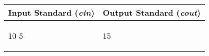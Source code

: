 \documentclass[12pt,a4paper]{article}
\begin{document}
\begin{tabular}{|@{}p{}@{}|@{}p{}@{}|}
\hline
\multicolumn{1}{|c|}{\bfseries Input Standard (\textit{cin})} &
\multicolumn{1}{c|}{\bfseries Output Standard (\textit{cout})} \\
\hline
\begin{textQuoteCell}
10 5
\end{textQuoteCell} &
\begin{textQuoteCell}
15
\end{textQuoteCell} \\    
\hline
\end{tabular}
\vspace{1em}


\end{document}
